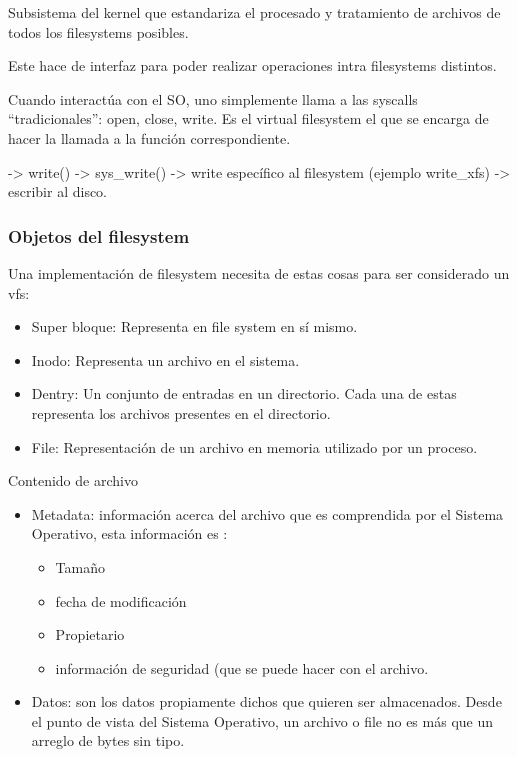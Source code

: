 \documentclass{article}
\begin{document}
Subsistema del kernel que estandariza el procesado y tratamiento de
archivos de todos los filesystems posibles.

Este hace de interfaz para poder realizar operaciones intra filesystems
distintos.

Cuando interactúa con el SO, uno simplemente llama a las syscalls
``tradicionales'': open, close, write. Es el virtual filesystem el que
se encarga de hacer la llamada a la función correspondiente.

-\textgreater{} write() -\textgreater{} sys\_write() -\textgreater{}
write específico al filesystem (ejemplo write\_xfs) -\textgreater{}
escribir al disco.

\subsubsection{Objetos del filesystem}\label{objetos-del-filesystem}

Una implementación de filesystem necesita de estas cosas para ser
considerado un vfs:

\begin{itemize}
\item
  Super bloque: Representa en file system en sí mismo.
\item
  Inodo: Representa un archivo en el sistema.
\item
  Dentry: Un conjunto de entradas en un directorio. Cada una de estas
  representa los archivos presentes en el directorio.
\item
  File: Representación de un archivo en memoria utilizado por un
  proceso.
\end{itemize}

Contenido de archivo

\begin{itemize}
\item
  Metadata: información acerca del archivo que es comprendida por el
  Sistema Operativo, esta información es :

  \begin{itemize}
  \item
    Tamaño
  \item
    fecha de modificación
  \item
    Propietario
  \item
    información de seguridad (que se puede hacer con el archivo.
  \end{itemize}
\item
  Datos: son los datos propiamente dichos que quieren ser almacenados.
  Desde el punto de vista del Sistema Operativo, un archivo o file no es
  más que un arreglo de bytes sin tipo.
\end{itemize}
\end{document}
